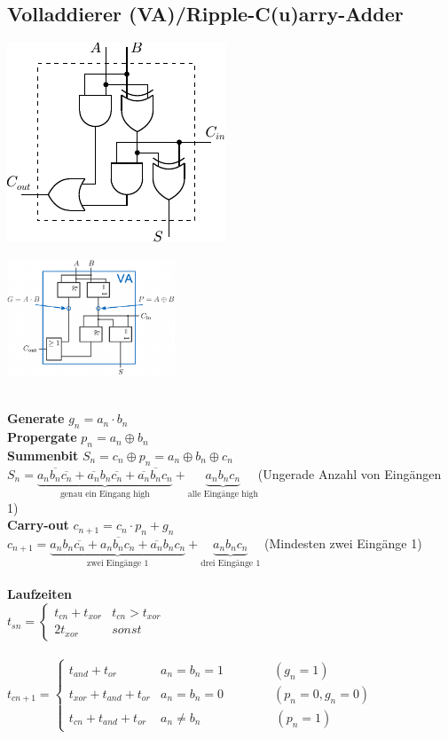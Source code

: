 \documentclass[6pt,a4paper]{scrartcl}
\newcommand{\ol}[1]{\ensuremath{\overline{#1}}}									%
\begin{document}
\begin{multicols*}{3}
\section{Volladdierer (VA)/Ripple-C(u)arry-Adder}
\parbox{5.0cm}{ \includegraphics{./img/ds/volladdierer.pdf} }
\hspace*{-.7cm}\parbox{5.0cm}{ \includegraphics[width=5.0cm]{./img/ds/volladdierer-iec.png} } \\
\textbf{Generate} $g_n = a_n \cdot b_n$\\
\textbf{Propergate} $p_n = a_n \oplus b_n$\\
\textbf{Summenbit} $S_n = c_n \oplus p_n= a_n \oplus b_n \oplus c_n$\\
$S_n = \underbrace{a_n\ol{b_n} \ol{c_n} + \ol{a_n}b_n\ol{c_n} + \ol{a_n}\ol{b_n}c_n}_{\text{genau ein Eingang high}} + \underbrace{a_nb_nc_n}_{\text{alle Eingänge high}}$(Ungerade Anzahl von Eingängen 1) \\
\textbf{Carry-out} $c_{n+1} = c_n \cdot p_n + g_n$\\
$c_{n+1}=\underbrace{a_nb_n\ol{c_n} + a_n\ol{b_n}c_n + \ol{a_n}b_nc_n}_{\text{zwei Eingänge 1}} + \underbrace{a_nb_nc_n}_{\text{drei Eingänge 1}}$ (Mindesten zwei Eingänge 1)
\\ \\
\textbf{Laufzeiten} \\
$t_{sn} = \begin{cases} t_{cn} + t_{xor} & t_{cn} > t_{xor} \\ 2 t_{xor} & sonst \end{cases}$\\ \\
$t_{cn+1} = 
\begin{cases}
	t_{and} + t_{or}           & a_n = b_n = 1 \qquad \qquad (g_n=1)   \\
	t_{xor} + t_{and} + t_{or} & a_n = b_n = 0 \qquad \qquad  (p_n = 0, g_n = 0) \\
	t_{cn} + t_{and} + t_{or}  & a_n \ne b_n \qquad \qquad \qquad  (p_n = 1)
\end{cases}$\\


\end{multicols*}
\end{document}
